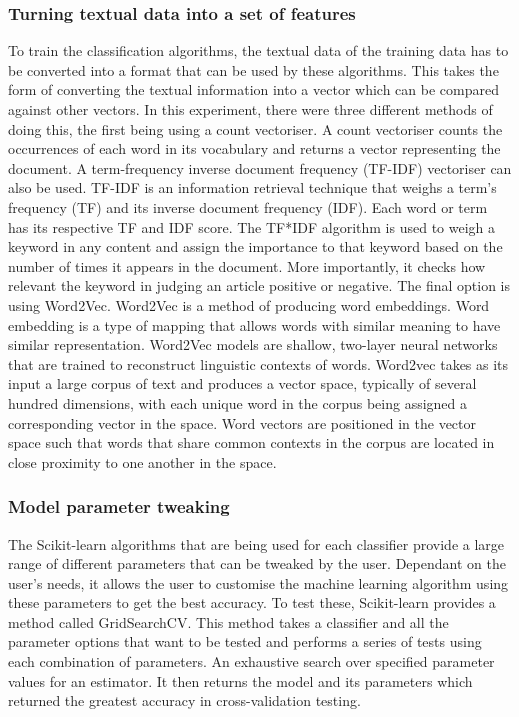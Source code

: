 \documentclass[a4paper,11pt]{report}
\begin{document}
\subsubsection{Turning textual data into a set of features}
To train the classification algorithms, the textual data of the training data has to be converted into a format that can be used by these algorithms. This takes the form of converting the textual information into a vector which can be compared against other vectors. In this experiment, there were three different methods of doing this, the first being using a count vectoriser.  A count vectoriser counts the occurrences of each word in its vocabulary and returns a vector representing the document.  A term-frequency inverse document frequency (TF-IDF) vectoriser can also be used.  TF-IDF is an information retrieval technique that weighs a term’s frequency (TF) and its inverse document frequency (IDF). Each word or term has its respective TF and IDF score. The TF*IDF algorithm is used to weigh a keyword in any content and assign the importance to that keyword based on the number of times it appears in the document. More importantly, it checks how relevant the keyword in judging an article positive or negative.  The final option is using Word2Vec. Word2Vec is a method of producing word embeddings. Word embedding is a type of mapping that allows words with similar meaning to have similar representation. Word2Vec models are shallow, two-layer neural networks that are trained to reconstruct linguistic contexts of words. Word2vec takes as its input a large corpus of text and produces a vector space, typically of several hundred dimensions, with each unique word in the corpus being assigned a corresponding vector in the space. Word vectors are positioned in the vector space such that words that share common contexts in the corpus are located in close proximity to one another in the space.

\subsubsection{Model parameter tweaking}
The Scikit-learn algorithms that are being used for each classifier provide a large range of different parameters that can be tweaked by the user. Dependant on the user's needs, it allows the user to customise the machine learning algorithm using these parameters to get the best accuracy. To test these, Scikit-learn provides a method called GridSearchCV. This method takes a classifier and all the parameter options that want to be tested and performs a series of tests using each combination of parameters. An exhaustive search over specified parameter values for an estimator. It then returns the model and its parameters which returned the greatest accuracy in cross-validation testing.
\end{document}
